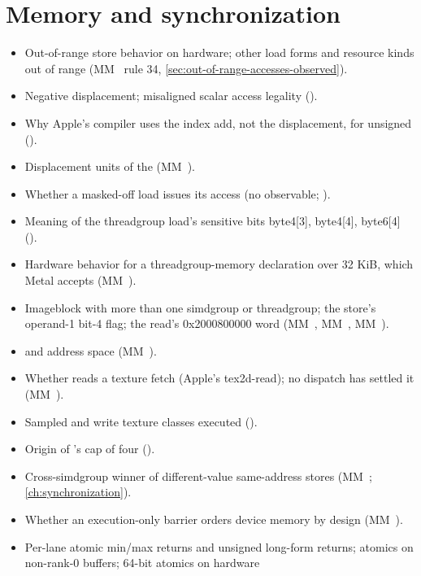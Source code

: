 \section{Memory and synchronization}\label{sec:memory-synchronization-chapters}

\begin{itemize}
\item Out-of-range store behavior on hardware; other load forms and resource kinds out of range (MM~ rule 34, \cref{sec:out-of-range-accesses-observed}).
\item Negative displacement; misaligned scalar access legality ().
\item Why Apple's compiler uses the index add, not the displacement, for unsigned  ().
\item Displacement units of the  (MM~).
\item Whether a masked-off load issues its access (no observable; ).
\item Meaning of the threadgroup load's sensitive bits byte4{[}3{]}, byte4{[}4{]}, byte6{[}4{]} ().
\item Hardware behavior for a threadgroup-memory declaration over 32 KiB, which Metal accepts (MM~).
\item Imageblock with more than one simdgroup or threadgroup; the store's operand-1 bit-4 flag; the read's 0x2000800000 word
  (MM~, MM~, MM~).
\item {} and  address space (MM~).
\item Whether  reads a texture fetch (Apple's tex2d-read); no dispatch has settled it (MM~).
\item Sampled and write texture classes executed ().
\item Origin of 's cap of four ().
\item Cross-simdgroup winner of different-value same-address stores (MM~; \cref{ch:synchronization}).
\item Whether an execution-only barrier orders device memory by design (MM~).
\item Per-lane atomic min/max returns and unsigned long-form returns; atomics on non-rank-0 buffers; 64-bit atomics on hardware

\end{itemize}
